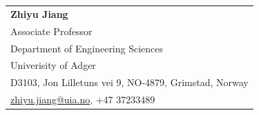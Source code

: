 \documentclass[10pt]{ctexart}
\begin{document}
{        \\ \\
        \begin{tabular}{@{}l@{}}
        \textbf{Zhiyu Jiang}\\
        Associate Professor\\
    	Department of Engineering Sciences\\
        Univerisity of Adger\\
        D3103, Jon Lilletuns vei 9, NO-4879, Grimstad, Norway\\
        \url{zhiyu.jiang@uia.no}, +47 37233489
        \end{tabular}
}\else{

}\fi
\end{document}
